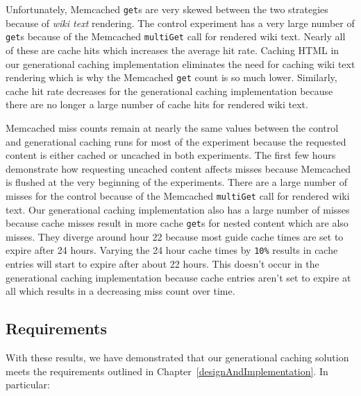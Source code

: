 \documentclass[12pt]{ucthesis}
\begin{document}
Unfortunately, \textsf{Memcached} {\tt get}s are very skewed between the two strategies because of \textit{wiki text} rendering.
The control experiment has a very large number of {\tt get}s because of the \textsf{Memcached} {\tt multiGet} call for rendered wiki text.
Nearly all of these are cache hits which increases the average hit rate.
Caching HTML in our generational caching implementation eliminates the need for caching wiki text rendering which is why the \textsf{Memcached} {\tt get} count is so much lower.
Similarly, cache hit rate decreases for the generational caching implementation because there are no longer a large number of cache hits for rendered wiki text.

\textsf{Memcached} miss counts remain at nearly the same values between the control and generational caching runs for most of the experiment because the requested content is either cached or uncached in both experiments.
The first few hours demonstrate how requesting uncached content affects misses because \textsf{Memcached} is flushed at the very beginning of the experiments.
There are a large number of misses for the control because of the \textsf{Memcached} {\tt multiGet} call for rendered wiki text.
Our generational caching implementation also has a large number of misses because cache misses result in more cache {\tt get}s for nested content which are also misses.
They diverge around hour 22 because most guide cache times are set to expire after 24 hours.
Varying the 24 hour cache times by {\tt 10\%} results in cache entries will start to expire after about 22 hours.
This doesn't occur in the generational caching implementation because cache entries aren't set to expire at all which results in a decreasing miss count over time.

\subsection{Requirements}
With these results, we have demonstrated that our generational caching solution meets the requirements outlined in Chapter~\ref{designAndImplementation}.
In particular:
\end{document}
